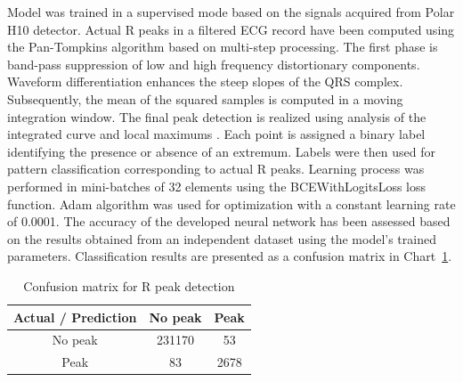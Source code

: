 \documentclass{citask}
\begin{document}
Model was trained in a supervised mode based on the signals acquired from Polar H10 detector. Actual R peaks in a filtered ECG record have been computed using the Pan-Tompkins algorithm based on multi-step processing. The first phase is band-pass suppression of low and high frequency distortionary components. Waveform differentiation enhances the steep slopes of the QRS complex. Subsequently, the mean of the squared samples is computed in a moving integration window. The final peak detection is realized using analysis of the integrated curve and local maximums \cite{27}.
Each point is assigned a binary label identifying the presence or absence of an extremum. Labels were then used for pattern classification corresponding to actual R peaks.
Learning process was performed in mini-batches of 32 elements using the BCEWithLogitsLoss loss function. Adam algorithm was used for optimization with a constant learning rate of 0.0001. The accuracy of the developed neural network has been assessed based on the results obtained from an independent dataset using the model's trained parameters. Classification results are presented as a confusion matrix in Chart~\ref{tab:conf_matrix}.


\begin{table}[ht]
\centering
\caption{Confusion matrix for R peak detection}
\label{tab:conf_matrix}
\begin{tabular}{|c|c|c|}
\hline
\textbf{Actual / Prediction} & \textbf{No peak } & \textbf{Peak } \\
\hline
No peak  & 231170 & 53 \\
Peak  & 83 & 2678 \\
\hline
\end{tabular}
\end{table}
\end{document}
